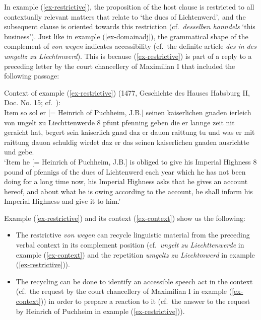 \documentclass[output=paper
  ,nobabel
  ,draftmode
  ,babelshorthands
  ,colorlinks, citecolor=brown
]{langscibook}
\begin{document}
\noindent
In example (\ref{ex-restrictive}), the proposition of the host clause is restricted to all contextually relevant matters that relate to ‘the dues of Lichtenwerd’, and the subsequent clause is oriented towards this restriction (cf.\ \emph{desselben hanndels }‘this business’). Just like in example (\ref{ex-domainadj}), the grammatical shape of the complement of \emph{von wegen} indicates accessibility (cf.\ the definite article \emph{des in des umgeltz zu Liechtmwerd}). This is because (\ref{ex-restrictive}) is part of a reply to a preceding letter by the court chancellery of Maximilian I that included the following passage:

\ea\label{ex-context} Context of example (\ref{ex-restrictive}) (1477, Geschichte des Hauses Habsburg II, Doc. No. 15; cf.\ \citealp[302]{Chmel1855}):\\
\smallskip
Item so sol er [= Heinrich of Puchheim, J.B.] seinen kaiserlichen gnaden ierleich von ungelt zu Liechttenwerde 8 pfunt pfenning geben die er lannge zeit nit geraicht hat, begert sein kaiserlich gnad daz er dauon raittung tu und was er mit raittung dauon schuldig wirdet daz er das seinen kaiserlichen gnaden ausrichtte und gebe.\\
	`Item he [= Heinrich of Puchheim, J.B.] is obliged to give his Imperial Highness 8 pound of pfennigs of the dues of Lichtenwerd each year which he has not been doing for a long time now, his Imperial Highness asks that he gives an account hereof, and about what he is owing according to the account, he shall inform his Imperial Highness and give it to him.'
\z

Example (\ref{ex-restrictive}) and its context (\ref{ex-context}) show us the following:

\begin{itemize}
\item The restrictive \emph{von wegen} can recycle linguistic material from the preceding verbal context in its complement position (cf.\ \emph{ungelt zu Liechttenwerde} in example (\ref{ex-context}) and the repetition \emph{umgeltz zu Liechtmwerd} in example (\ref{ex-restrictive})).

\item The recycling can be done to identify an accessible speech act in the context (cf.\ the request by the court chancellery of Maximilian I in example (\ref{ex-context})) in order to prepare a reaction to it (cf.\ the answer to the request by Heinrich of Puchheim in example (\ref{ex-restrictive})).
\end{itemize}
\end{document}
